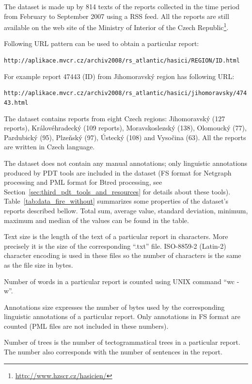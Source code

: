 The dataset is made up by 814 texts of the reports collected in the time period from February to September 2007 using a RSS feed. All the reports are still available on the web site of the Ministry of Interior of the Czech Republic\footnote{\url{http://www.hzscr.cz/hasicien/}}. 

Following URL pattern can be used to obtain a particular report:


\begin{center}
\verb+http://aplikace.mvcr.cz/archiv2008/rs_atlantic/hasici/REGION/ID.html+
\end{center}

For example report 47443 (ID) from Jihomoravský region has following URL:

\begin{center}
\verb+http://aplikace.mvcr.cz/archiv2008/rs_atlantic/hasici/jihomoravsky/47443.html+
\end{center}


The dataset contains reports from eight Czech regions: Jihomoravský (127 reports), Královéhradecký (109 reports), Moravskoslezský (138), Olomoucký (77), Pardubický (95), Plzeňský (97), Ústecký (108) and Vysočina (63). All the reports are written in Czech language. 

The dataset does not contain any manual annotations; only linguistic annotations produced by PDT tools are included in the dataset (FS format for Netgraph processing and PML format for Btred processing, see Section~\ref{sec:third_pdt_tools_and_resources} for details about these tools). Table~\ref{tab:data_fire_without} summarizes some properties of the dataset’s reports described bellow.  Total sum, average value, standard deviation, minimum, maximum and median of the values can be found in the table.


Text size is the length of the text of a particular report in characters. More precisely it is the size of the corresponding ``.txt'' file. ISO-8859-2 (Latin-2) character encoding is used in these files so the number of characters is the same as the file size in bytes. 

Number of words in a particular report is counted using UNIX command ``wc -w''.

Annotations size expresses the number of bytes used by the corresponding linguistic annotations of a particular report. Only annotations in FS format are counted (PML files are not included in these numbers).

Number of trees is the number of tectogrammatical trees in a particular report. The number also corresponds with the number of sentences in the report.


